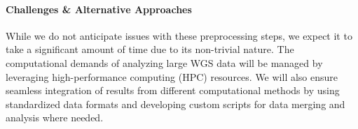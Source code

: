 
\paragraph{Challenges \& Alternative Approaches}

While we do not anticipate issues with these preprocessing steps, 
we expect it to take a significant amount of time due to its non-trivial nature.
The computational demands of analyzing large WGS data will be managed by leveraging high-performance computing (HPC) resources. 
We will also ensure seamless integration of results from different computational methods by using standardized data formats 
and developing custom scripts for data merging and analysis where needed. 



